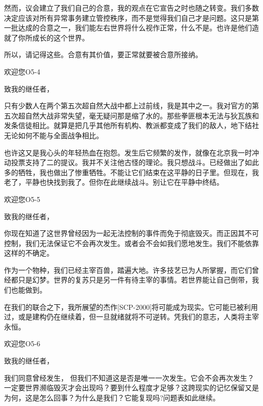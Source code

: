\begin{whiteboxbb}
\begin{scpbox}
然而，议会建立了我们自己的合意，我的观点在它宣告之时也随之转变。我们多数决定应该对所有异常事务建立管控秩序，而不是觉得我们自己才是问题。这只是第一批达成的合意之一，我们能左右世界将什么视作正常，什么不是。也许是他们造就了你所成长的这个世界。

所以，请记得这些。合意有其价值，要正常就要被合意所接纳。

\end{scpbox}

\begin{scpbox}

欢迎您O5-4

致我的继任者，

只有少数人在两个第五次超自然大战中都上过前线，我是其中之一。我对官方的第五次超自然大战非常失望，毫无疑问那是缩了水的。那些拳匪根本无法与狄瓦族和发条信徒相比。就算是把几乎其他所有机构、教派都变成了我们的敌人，地下结社无论如何不能与全面战争相比。

也许这又是我心头的年轻热血在抱怨。发生后它频繁的发作，就像在北京我一时冲动投票支持了二的提议。我并不关注他古怪的理论。我只想战斗。已经做出了如此多的牺牲，我也做出了惨重牺牲。不能让它们结束在这平静的日子里。但现在，我老了，平静也快找到我了。但你在此继续战斗。别让它在平静中终结。

\end{scpbox}

\begin{scpbox}

欢迎您O5-5

致我的继任者，

你现在知道了这世界曾经因为一起无法控制的事件而免于彻底毁灭。而正因其不可控制，我们无法保证它不会再次发生。或者会不会如我们愿地发生。我们不能依靠这样的不确定。

作为一个物种，我们已经主宰百兽，踏遍大地。许多技艺已为人所掌握，而它们曾经都只是幻梦。世界的复苏只是另一件有待主宰的事情。若世界能让自己倒带，我们也能做到。

在我们的联合之下，我所展望的杰作[SCP-2000]将可能成为现实。它可能已被利用过，或是建构仍在继续着，但一旦就绪就将不可逆转。凭我们的意志，人类将主宰永恒。

\end{scpbox}

\begin{scpbox}

欢迎您O5-6

致我的继任者，

我们同意曾经发生， 但我们不知道这是否是唯一一次发生。它会不会再次发生？一定要世界濒临毁灭才会出现吗？要到什么程度才足够？这跨现实的记忆保留又是为何，这是怎么回事？为什么是我们？它能复现吗?问题表如此继续。


\end{scpbox}
\end{whiteboxbb}
